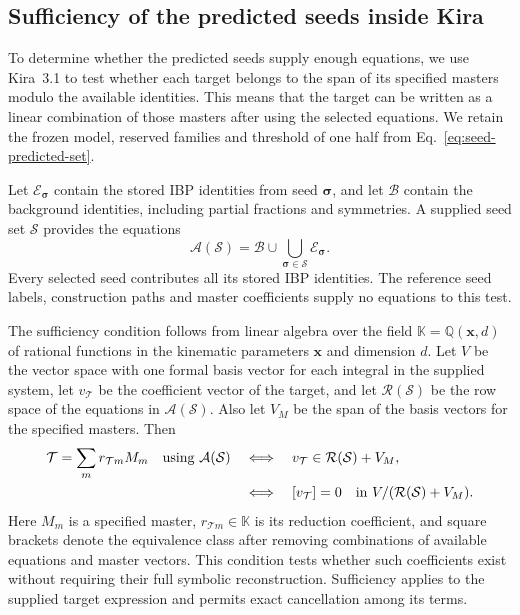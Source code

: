 \subsection{Sufficiency of the predicted seeds inside Kira}
\label{sec:seed-kira-sufficiency}
To determine whether the predicted seeds supply enough equations,
we use Kira~3.1 to test whether each target belongs to the span of
its specified masters modulo the available identities. This means
that the target can be written as a linear combination of those
masters after using the selected equations. We retain the frozen
model, reserved families and threshold of one half from
Eq.~\eqref{eq:seed-predicted-set}.

Let $\mathcal E_{\boldsymbol\sigma}$ contain the stored IBP identities
from seed $\boldsymbol\sigma$, and let $\mathcal B$ contain the
background identities, including partial fractions and symmetries.
A supplied seed set $\mathcal S$ provides the equations
\begin{equation}
 \mathcal A(\mathcal S)
 =\mathcal B\cup
       \bigcup_{\boldsymbol\sigma\in\mathcal S}
                       \mathcal E_{\boldsymbol\sigma}.
 \label{eq:kira-selected-relations}
\end{equation}
Every selected seed contributes all its stored IBP identities.
The reference seed labels, construction paths and master coefficients
supply no equations to this test.

The sufficiency condition follows from linear algebra over the field
$\mathbb K=\mathbb Q(\boldsymbol x,d)$ of rational functions in the
kinematic parameters $\boldsymbol x$ and dimension $d$.
Let $V$ be the vector space with one formal basis vector for each
integral in the supplied system, let $v_{\mathcal T}$ be the coefficient
vector of the target, and let $\mathcal R(\mathcal S)$ be the row space
of the equations in $\mathcal A(\mathcal S)$. Also let
$V_M$ be the span of the basis vectors for the specified
masters. Then
\begin{equation}
 \begin{aligned}
 \mathcal T=\sum_m r_{\mathcal Tm} M_m
 \quad\hbox{using }\mathcal A(\mathcal S)
 &\quad\Longleftrightarrow\quad
 v_{\mathcal T}\in\mathcal R(\mathcal S)+V_M,\\
 &\quad\Longleftrightarrow\quad
 [v_{\mathcal T}]=0
 \quad\hbox{in }V/(\mathcal R(\mathcal S)+V_M).
 \end{aligned}
 \label{eq:kira-master-span}
\end{equation}
Here $M_m$ is a specified master, $r_{\mathcal Tm}\in\mathbb K$ is its reduction
coefficient, and square brackets denote the equivalence class after
removing combinations of available equations and master vectors.
This condition tests whether such coefficients exist without
requiring their full symbolic reconstruction.
Sufficiency applies to the supplied target expression and permits
exact cancellation among its terms.

